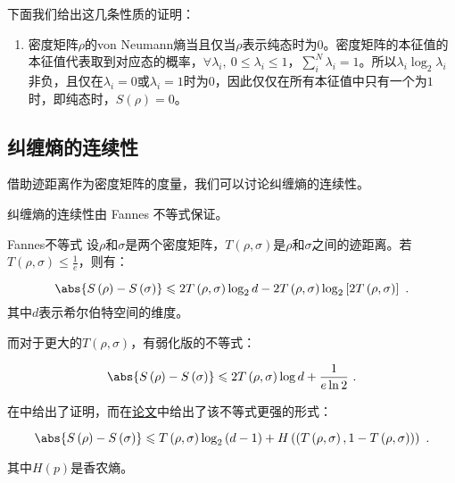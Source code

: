 下面我们给出这几条性质的证明：

\begin{enumerate}
\item 密度矩阵$\rho$的von Neumann熵当且仅当$\rho$表示纯态时为0。密度矩阵的本征值的本征值代表取到对应态的概率，$\forall \lambda_i ,~ 0\leqslant \lambda_i \leqslant1$，$\sum_i^N \lambda_i = 1$。所以$\lambda_i \log_2 \lambda_i$非负，且仅在$\lambda_i = 0$或$\lambda_i = 1$时为$0$，因此仅仅在所有本征值中只有一个为$1$时，即纯态时，$S\left(\rho\right) = 0$。
\end{enumerate}


\subsection{纠缠熵的连续性}

借助迹距离作为密度矩阵的度量，我们可以讨论纠缠熵的连续性。

纠缠熵的连续性由 Fannes 不等式保证。

\begin{theorem}{Fannes不等式}
设$\rho$和$\sigma$是两个密度矩阵，$T\left(\rho,\sigma\right)$是$\rho$和$\sigma$之间的迹距离。若$T\left(\rho,\sigma\right) \leqslant \frac{1}{e}$，则有：

\begin{equation}
\abs{S\left(\rho\right) - S\left(\sigma\right)} \leqslant 2T\left(\rho,\sigma\right)\log_2 d - 2T\left(\rho,\sigma\right) \log_2\left[ 2 T\left(\rho,\sigma\right)\right]~.
\end{equation}
其中$d$表示希尔伯特空间的维度。

\end{theorem}

而对于更大的$T\left(\rho,\sigma\right)$，有弱化版的不等式：

\begin{equation}
\abs{S\left(\rho\right) - S\left(\sigma\right)} \leqslant 2 T\left(\rho,\sigma\right)\log d + \frac{1}{e\ln 2}~.
\end{equation}

在\cite{量子信息}中给出了证明，而在\href{https://arxiv.org/pdf/quant-ph/0610146.pdf}{论文}中给出了该不等式更强的形式：

\begin{equation}
\abs{S\left(\rho\right) - S\left(\sigma\right)} \leqslant T\left(\rho,\sigma\right)\log_2\left(d-1\right) + H\left(\left(T\left(\rho,\sigma\right),1-T\left(\rho,\sigma\right)\right)\right)~.
\end{equation}

其中$H(p)$是香农熵。
